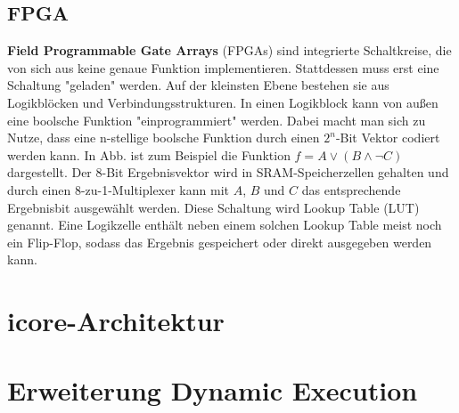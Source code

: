 \subsection{FPGA}
\label{sec:fpga}
\textbf{Field Programmable Gate Arrays} (FPGAs) sind integrierte Schaltkreise, die von sich aus keine genaue Funktion implementieren. Stattdessen muss erst eine Schaltung "geladen" werden.
Auf der kleinsten Ebene bestehen sie aus Logikblöcken und Verbindungsstrukturen. In einen Logikblock kann von außen eine boolsche Funktion "einprogrammiert" werden. Dabei macht man sich zu Nutze,
dass eine n-stellige boolsche Funktion durch einen $2^n$-Bit Vektor codiert werden kann. In Abb. \comment{\ref{fig:fpga_lut}} ist zum Beispiel die Funktion $f = A \vee (B \wedge \neg C)$ dargestellt.
Der 8-Bit Ergebnisvektor wird in SRAM-Speicherzellen gehalten und durch einen 8-zu-1-Multiplexer kann mit $A$, $B$ und $C$ das entsprechende Ergebnisbit ausgewählt werden. Diese Schaltung wird Lookup Table (LUT) genannt.
Eine Logikzelle enthält neben einem solchen Lookup Table meist noch ein Flip-Flop, sodass das Ergebnis gespeichert oder direkt ausgegeben werden kann.


\section{icore-Architektur}
\label{sec:icore_arch}

\section{Erweiterung Dynamic Execution}
